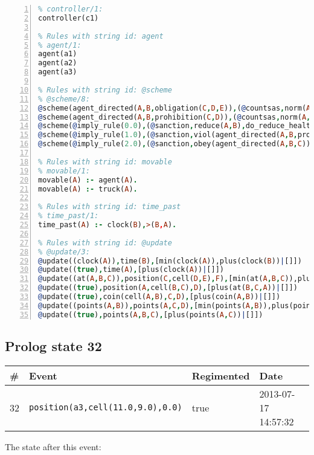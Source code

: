 \documentclass[11pt]{article}\usepackage[utf8]{inputenc}\usepackage{geometry}
\begin{document}
\begin{lstlisting}[language=Prolog, numbers=left]
% Rules with string id: controller
% controller/1:
controller(c1)

% Rules with string id: agent
% agent/1:
agent(a1)
agent(a2)
agent(a3)

% Rules with string id: @scheme
% @scheme/8:
@scheme(agent_directed(A,B,obligation(C,D,E)),(@countsas,norm(A,B,F,obligation(C,D,E)),F),false,(listTrue(C)),(time_past(D)),false,[plus(viol(agent_directed(A,B,obligation(C,D,E))))|[]],[plus(obey(agent_directed(A,B,obligation(C,D,E))))|[]])
@scheme(agent_directed(A,B,prohibition(C,D)),(@countsas,norm(A,B,E,prohibition(C,D)),E),(listTrue(C)),false,(false),false,[plus(viol(agent_directed(A,B,prohibition(C,D))))|[]],[plus(obey(agent_directed(A,B,prohibition(C,D))))|[]])
@scheme(@imply_rule(0.0),(@sanction,reduce(A,B),do_reduce_health(A,B),notifyAgent(A,changed(status))),true,false,false,false,[min(reduce(A,B))|[]],[])
@scheme(@imply_rule(1.0),(@sanction,viol(agent_directed(A,B,prohibition(C,D))),do_sanction(D)),true,false,false,false,[min(viol(agent_directed(A,B,prohibition(C,D))))|[]],[])
@scheme(@imply_rule(2.0),(@sanction,obey(agent_directed(A,B,C))),true,false,false,false,[min(obey(agent_directed(A,B,C)))|[]],[])

% Rules with string id: movable
% movable/1:
movable(A) :- agent(A).
movable(A) :- truck(A).

% Rules with string id: time_past
% time_past/1:
time_past(A) :- clock(B),>(B,A).

% Rules with string id: @update
% @update/3:
@update((clock(A)),time(B),[min(clock(A)),plus(clock(B))|[]])
@update((true),time(A),[plus(clock(A))|[]])
@update((at(A,B,C)),position(C,cell(D,E),F),[min(at(A,B,C)),plus(at(D,E,C))|[]])
@update((true),position(A,cell(B,C),D),[plus(at(B,C,A))|[]])
@update((true),coin(cell(A,B),C,D),[plus(coin(A,B))|[]])
@update((points(A,B)),points(A,C,D),[min(points(A,B)),plus(points(A,D))|[]])
@update((true),points(A,B,C),[plus(points(A,C))|[]])

\end{lstlisting}
\clearpage 
\subsection{Prolog state 32}
\begin{table}[ht]
\centering 
\begin{tabular}{l l l l} 
\textbf{\#} & \textbf{Event} & \textbf{Regimented} & \textbf{Date} \\ [0.5ex] 
\hline
32&\texttt{position(a3,cell(11.0,9.0),0.0)}&true&2013-07-17 14:57:32\\ [1ex] \hline\end{tabular}
\end{table}
The state after this event:
\end{document}
